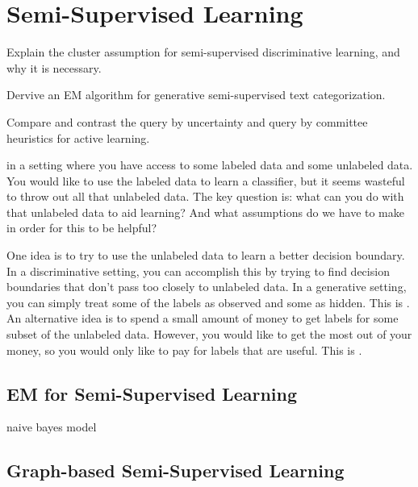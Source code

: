 
\chapter{Semi-Supervised Learning} \label{sec:semi}

\chapterquote{}{}

\begin{learningobjectives}
\item Explain the cluster assumption for semi-supervised
  discriminative learning, and why it is necessary.
\item Dervive an EM algorithm for generative semi-supervised text
  categorization.
\item Compare and contrast the query by uncertainty and query by
  committee heuristics for active learning.
\end{learningobjectives}

\dependencies{}

 in a setting where you have access
to some labeled data and some unlabeled data.  You would like to use
the labeled data to learn a classifier, but it seems wasteful to throw
out all that unlabeled data.  The key question is: what can you do
with that unlabeled data to aid learning?  And what assumptions do we
have to make in order for this to be helpful?

One idea is to try to use the unlabeled data to learn a better
decision boundary.  In a discriminative setting, you can accomplish
this by trying to find decision boundaries that don't pass too closely
to unlabeled data.  In a generative setting, you can simply treat some
of the labels as observed and some as hidden.  This is
.  An alternative idea is
to spend a small amount of money to get labels for some subset of the
unlabeled data.  However, you would like to get the most out of your
money, so you would only like to pay for labels that are useful.  This
is .

\section{EM for Semi-Supervised Learning}

naive bayes model

\section{Graph-based Semi-Supervised Learning}

